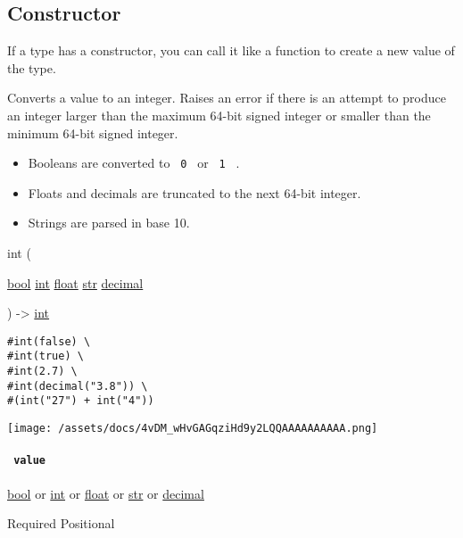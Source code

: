 \subsection{\texorpdfstring{Constructor
{}}{Constructor }}\label{constructor}

\label{constructor-constructor-tooltip}
If a type has a constructor, you can call it like a function to create a
new value of the type.

Converts a value to an integer. Raises an error if there is an attempt
to produce an integer larger than the maximum 64-bit signed integer or
smaller than the minimum 64-bit signed integer.

\begin{itemize}
\tightlist
\item
  Booleans are converted to \texttt{\ 0\ } or \texttt{\ 1\ } .
\item
  Floats and decimals are truncated to the next 64-bit integer.
\item
  Strings are parsed in base 10.
\end{itemize}

{ int } (

{ \href{/docs/reference/foundations/bool/}{bool}
\href{/docs/reference/foundations/int/}{int}
\href{/docs/reference/foundations/float/}{float}
\href{/docs/reference/foundations/str/}{str}
\href{/docs/reference/foundations/decimal/}{decimal} }

) -\textgreater{} \href{/docs/reference/foundations/int/}{int}

\begin{verbatim}
#int(false) \
#int(true) \
#int(2.7) \
#int(decimal("3.8")) \
#(int("27") + int("4"))
\end{verbatim}

\texttt{[image: /assets/docs/4vDM\_wHvGAGqziHd9y2LQQAAAAAAAAAA.png]}

\paragraph{\texorpdfstring{\texttt{\ value\ }}{ value }}\label{constructor-value}

\href{/docs/reference/foundations/bool/}{bool} {or}
\href{/docs/reference/foundations/int/}{int} {or}
\href{/docs/reference/foundations/float/}{float} {or}
\href{/docs/reference/foundations/str/}{str} {or}
\href{/docs/reference/foundations/decimal/}{decimal}

{Required} {{ Positional }}

